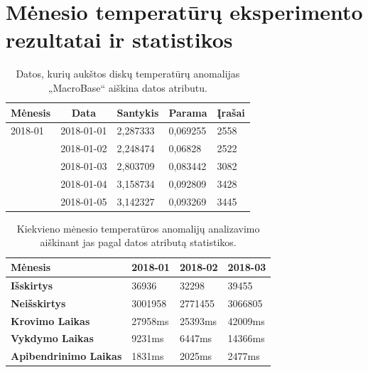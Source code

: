\documentclass{VUMIFPSkursinis}
\begin{document}
\section{Mėnesio temperatūrų eksperimento rezultatai ir statistikos} \label{sec:mėnTemp}
\begin{table}[H]
\centering
\caption{Datos, kurių aukštos diskų temperatūrų anomalijas „MacroBase“ aiškina datos atributu.}
\label{tab:rezMėn}
{\begin{tabular}{|l|l|l|l|l|}
\hline
\multicolumn{1}{|c|}{\textbf{Mėnesis}} & \multicolumn{1}{c|}{\textbf{Data}} & \multicolumn{1}{c|}{\textbf{Santykis}} & \multicolumn{1}{c|}{\textbf{Parama}} & \multicolumn{1}{c|}{\textbf{Įrašai}} \\ \hline
2018-01                                & 2018-01-01                         & 2,287333                               & 0,069255                             & 2558                                 \\ \hline
\cellcolor[HTML]{C0C0C0}               & 2018-01-02                         & 2,248474                               & 0,06828                              & 2522                                 \\ \hline
\cellcolor[HTML]{C0C0C0}               & 2018-01-03                         & 2,803709                               & 0,083442                             & 3082                                 \\ \hline
\cellcolor[HTML]{C0C0C0}               & 2018-01-04                         & 3,158734                               & 0,092809                             & 3428                                 \\ \hline
\cellcolor[HTML]{C0C0C0}               & 2018-01-05                         & 3,142327                               & 0,093269                             & 3445                                 \\ \hline
\end{tabular}}
\end{table}

\begin{table}[H]
\centering
\caption{Kiekvieno mėnesio temperatūros anomalijų analizavimo aiškinant jas pagal datos atributą statistikos.}
\label{tab:timeMėn}
{\begin{tabular}{|l|l|l|l|}
\hline
\textbf{Mėnesis}              & 2018-01 & 2018-02 & 2018-03 \\ \hline
\textbf{Išskirtys}            & 36936   & 32298   & 39455   \\ \hline
\textbf{Neišskirtys}         & 3001958 & 2771455 & 3066805 \\ \hline
\textbf{Krovimo Laikas}       & 27958ms & 25393ms & 42009ms \\ \hline
\textbf{Vykdymo Laikas}       & 9231ms  & 6447ms  & 14366ms \\ \hline
\textbf{Apibendrinimo Laikas} & 1831ms  & 2025ms  & 2477ms  \\ \hline
\end{tabular}}
\end{table}
\end{document}
